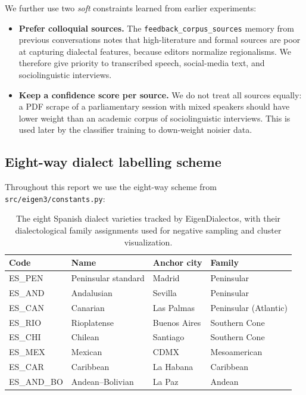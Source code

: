 \documentclass[11pt,a4paper]{article}
\begin{document}
We further use two \emph{soft} constraints learned from earlier experiments:

\begin{itemize}
  \item \textbf{Prefer colloquial sources.} The
        \texttt{feedback\_corpus\_sources} memory from previous
        conversations notes that high-literature and formal sources are
        poor at capturing dialectal features, because editors normalize
        regionalisms. We therefore give priority to transcribed speech,
        social-media text, and sociolinguistic interviews.
  \item \textbf{Keep a confidence score per source.} We do not treat all
        sources equally: a PDF scrape of a parliamentary session with
        mixed speakers should have lower weight than an academic corpus
        of sociolinguistic interviews. This is used later by the
        classifier training to down-weight noisier data.
\end{itemize}

\subsection{Eight-way dialect labelling scheme}

Throughout this report we use the eight-way scheme from
\texttt{src/eigen3/constants.py}:

\begin{table}[h]
\centering
\begin{tabular}{l l l l}
\toprule
\textbf{Code} & \textbf{Name} & \textbf{Anchor city} & \textbf{Family} \\
\midrule
ES\_PEN    & Peninsular standard  & Madrid       & Peninsular \\
ES\_AND    & Andalusian           & Sevilla      & Peninsular \\
ES\_CAN    & Canarian             & Las Palmas   & Peninsular (Atlantic) \\
ES\_RIO    & Rioplatense          & Buenos Aires & Southern Cone \\
ES\_CHI    & Chilean              & Santiago     & Southern Cone \\
ES\_MEX    & Mexican              & CDMX         & Mesoamerican \\
ES\_CAR    & Caribbean            & La Habana    & Caribbean \\
ES\_AND\_BO & Andean--Bolivian    & La Paz       & Andean \\
\bottomrule
\end{tabular}
\caption{The eight Spanish dialect varieties tracked by EigenDialectos,
with their dialectological family assignments used for negative sampling
and cluster visualization.}
\label{tab:dialects}
\end{table}
\end{document}
